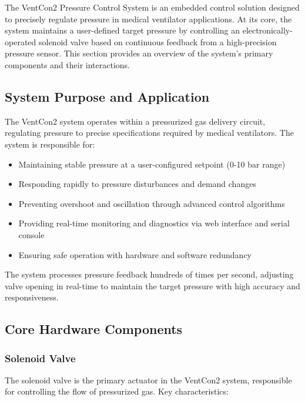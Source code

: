 \documentclass[12pt,a4paper]{article}
\begin{document}
The VentCon2 Pressure Control System is an embedded control solution designed to precisely regulate pressure in medical ventilator applications. At its core, the system maintains a user-defined target pressure by controlling an electronically-operated solenoid valve based on continuous feedback from a high-precision pressure sensor. This section provides an overview of the system's primary components and their interactions.

\subsection{System Purpose and Application}

The VentCon2 system operates within a pressurized gas delivery circuit, regulating pressure to precise specifications required by medical ventilators. The system is responsible for:

    \begin{itemize}
        \item Maintaining stable pressure at a user-configured setpoint (0-10 bar range)
        \item Responding rapidly to pressure disturbances and demand changes
        \item Preventing overshoot and oscillation through advanced control algorithms
        \item Providing real-time monitoring and diagnostics via web interface and serial console
        \item Ensuring safe operation with hardware and software redundancy
    \end{itemize}

The system processes pressure feedback hundreds of times per second, adjusting valve opening in real-time to maintain the target pressure with high accuracy and responsiveness.

\subsection{Core Hardware Components}

\subsubsection{Solenoid Valve}

The solenoid valve is the primary actuator in the VentCon2 system, responsible for controlling the flow of pressurized gas. Key characteristics:
\end{document}
